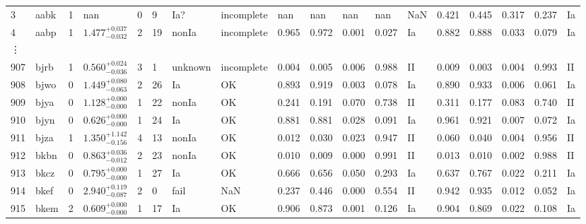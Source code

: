 \documentclass[useamsfonts]{pasj01}
\begin{document}
\begin{table}[ht]
{\begin{tabular}{p{1.5em}p{1em}p{1em}p{4.0em}p{2.1em}|p{0.6em}p{3.0em}p{4.5em}|p{2.9em}|p{1.3em}p{1.3em}p{1.3em}p{1em}|p{2.9em}|p{1.3em}p{1.3em}p{1.3em}p{1em}}
3    &  aabk &     1 &      nan &         0 &    9 &    Ia? &   incomplete &      nan &      nan &      nan &      nan &     NaN &    0.421 &    0.445 &    0.317 &    0.237 &      Ia \\
4    &  aabp &     1 &    $1.477_{-0.032}^{+0.037}$ &         2 &   19 &  nonIa &   incomplete &    0.965 &    0.972 &    0.001 &    0.027 &      Ia &    0.882 &    0.888 &    0.033 &    0.079 &      Ia \\
\vdots & & & & & & & & & & & & & & & & &\\
907  &  bjrb &     1 &    $0.560_{-0.036}^{+0.024}$ &         3 &    1 &  unknown &   incomplete &    0.004 &    0.005 &    0.006 &    0.988 &      II &    0.009 &    0.003 &    0.004 &    0.993 &      II \\
908  &  bjwo &     0 &    $1.449_{-0.063}^{+0.080}$ &         2 &   26 &     Ia &     OK &    0.893 &    0.919 &    0.003 &    0.078 &      Ia &    0.890 &    0.933 &    0.006 &    0.061 &      Ia \\
909  &  bjya &     0 &    $1.128_{-0.000}^{+0.000}$ &         1 &   22 &  nonIa &     OK &    0.241 &    0.191 &    0.070 &    0.738 &      II &    0.311 &    0.177 &    0.083 &    0.740 &      II \\
910  &  bjyn &     0 &    $0.626_{-0.000}^{+0.000}$ &         1 &   24 &     Ia &     OK &    0.881 &    0.881 &    0.028 &    0.091 &      Ia &    0.961 &    0.921 &    0.007 &    0.072 &      Ia \\
911  &  bjza &     1 &    $1.350_{-0.156}^{+1.142}$ &         4 &   13 &  nonIa &     OK &    0.012 &    0.030 &    0.023 &    0.947 &      II &    0.060 &    0.040 &    0.004 &    0.956 &      II \\
912  &  bkbn &     0 &    $0.863_{-0.012}^{+0.036}$ &         2 &   23 &  nonIa &     OK &    0.010 &    0.009 &    0.000 &    0.991 &      II &    0.013 &    0.010 &    0.002 &    0.988 &      II \\
913  &  bkcz &     0 &    $0.795_{-0.000}^{+0.000}$ &         1 &   27 &     Ia &     OK &    0.666 &    0.656 &    0.050 &    0.293 &      Ia &    0.637 &    0.767 &    0.022 &    0.211 &      Ia \\
914  &  bkef &     0 &    $2.940_{-0.087}^{+0.119}$ &         2 &    0 &   fail &    NaN &    0.237 &    0.446 &    0.000 &    0.554 &      II &    0.942 &    0.935 &    0.012 &    0.052 &      Ia \\
915  &  bkem &     2 &    $0.609_{-0.000}^{+0.000}$ &         1 &   17 &     Ia &     OK &    0.906 &    0.873 &    0.001 &    0.126 &      Ia &    0.904 &    0.869 &    0.022 &    0.108 &      Ia \\

\end{tabular}}
\end{table}
\end{document}

